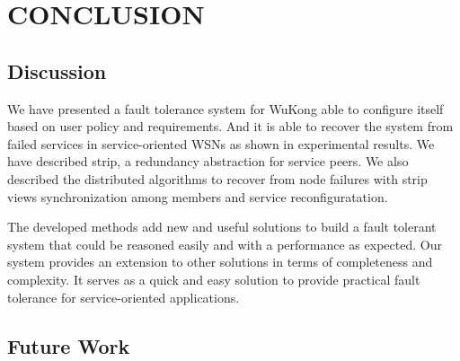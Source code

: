 \cleardoublepage
\singlespacing
\chapter{CONCLUSION}
\label{c:conclusion}
\doublespacing\nointerlineskip


\section{Discussion}

We have presented a fault tolerance system for WuKong able to configure itself
based on user policy and requirements. And it is able to recover the system from failed
services in service-oriented WSNs as shown in experimental results. We
have described strip, a redundancy abstraction for service peers. We also
described the distributed algorithms to recover from node failures with strip
views synchronization among members and service reconfiguratation.

The developed methods add new and useful solutions to build a fault tolerant
system that could be reasoned easily and with a performance as expected. Our
system provides an extension to other solutions in terms of completeness and
complexity. It serves as a quick and easy solution to provide practical fault
tolerance for service-oriented applications.



\section{Future Work}



